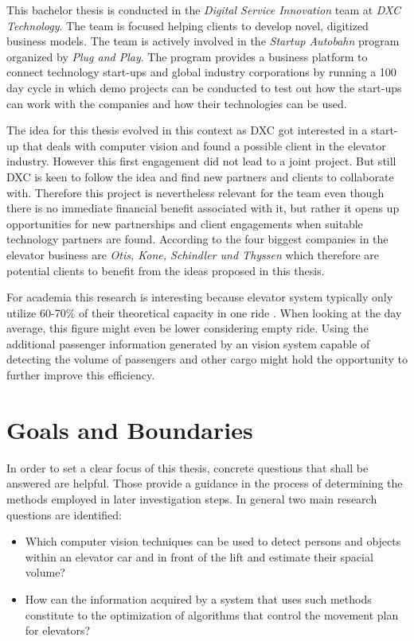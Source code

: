 This bachelor thesis is conducted in the \emph{Digital Service Innovation} team at \emph{DXC Technology}.
The team is focused helping clients to develop novel, digitized business models.
The team is actively involved in the \emph{Startup Autobahn} program organized by \emph{Plug and Play}.
The program provides a business platform to connect technology start-ups and global industry corporations
by running a 100 day cycle in which demo projects can be conducted to test out how the start-ups can work with the companies and how their technologies can be used.

The idea for this thesis evolved in this context as DXC got interested in a start-up that deals with computer vision and found a possible client in the elevator industry.
However this first engagement did not lead to a joint project.
But still DXC is keen to follow the idea and find new partners and clients to collaborate with.
Therefore this project is nevertheless relevant for the team even though there is no immediate financial benefit associated with it, 
but rather it opens up opportunities for new partnerships and client engagements when suitable technology partners are found.
According to \textcite[][p.~4]{unger2015aufzuege} the four biggest companies in the elevator business are \emph{Otis, Kone, Schindler und Thyssen} which therefore are potential clients to benefit from the ideas proposed in this thesis.

For academia this research is interesting because elevator system typically only utilize
60-70\% of their theoretical capacity in one ride \autocite[][p.~194]{unger2015aufzuege}. 
When looking at the day average, this figure might even be lower considering empty ride.
Using the additional passenger information generated by an vision system capable of detecting the volume of passengers and other cargo might hold the opportunity to further improve this efficiency.

\section{Goals and Boundaries}
\label{sec:intro:goals}

In order to set a clear focus of this thesis, concrete questions that shall be answered are helpful.
Those provide a guidance in the process of determining the methods employed in later investigation steps.
In general two main research questions are identified:

\begin{itemize}
    \item Which computer vision techniques can be used to detect persons and objects within an elevator car and in front of the lift and estimate their spacial volume?
    \item How can the information acquired by a system that uses such methods constitute to the optimization of algorithms that control the movement plan for elevators?
\end{itemize}

